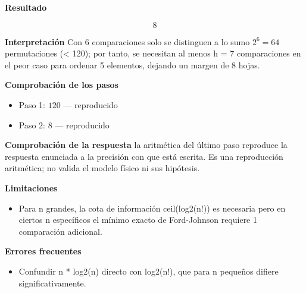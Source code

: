 \documentclass{book}
\begin{document}
\begin{tcolorbox}[title={Problema resuelto}, studiumworked, breakable]
\noindent\textbf{Resultado}

\[
8
\]

\noindent\textbf{Interpretación}
Con 6 comparaciones solo se distinguen a lo sumo \(2^6 = 64\) permutaciones (< 120); por tanto, se necesitan al menos h = 7 comparaciones en el peor caso para ordenar 5 elementos, dejando un margen de 8 hojas.

\noindent\textbf{Comprobación de los pasos}
\begin{itemize}
\item Paso 1: $120$ — reproducido
\item Paso 2: $8$ — reproducido
\end{itemize}

\noindent\textbf{Comprobación de la respuesta} la aritmética del último paso reproduce la respuesta enunciada a la precisión con que está escrita. Es una reproducción aritmética; no valida el modelo físico ni sus hipótesis.

\noindent\textbf{Limitaciones}
\begin{itemize}
\item Para n grandes, la cota de información ceil(log2(n!)) es necesaria pero en ciertos n específicos el mínimo exacto de Ford-Johnson requiere 1 comparación adicional.
\end{itemize}

\noindent\textbf{Errores frecuentes}
\begin{itemize}
\item Confundir n * log2(n) directo con log2(n!), que para n pequeños difiere significativamente.
\end{itemize}
\end{tcolorbox}
\end{document}
